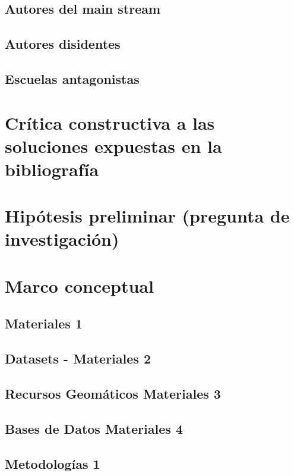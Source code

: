 \documentclass[12pt,a4paper,oneside]{book}
\begin{document}
\subsection{Autores del main stream}

\newpage

\subsection{Autores disidentes}

\subsection{Escuelas antagonistas} 

\section{Crítica constructiva a las soluciones expuestas en la bibliografía}

  
\section{Hipótesis preliminar (pregunta de investigación)}

\section{Marco conceptual}

\subsection{Materiales 1}

\subsection{Datasets - Materiales 2}

\subsection{Recursos Geomáticos Materiales 3}

\subsection{Bases de Datos Materiales 4}

\subsection{Metodologías 1}
\end{document}
